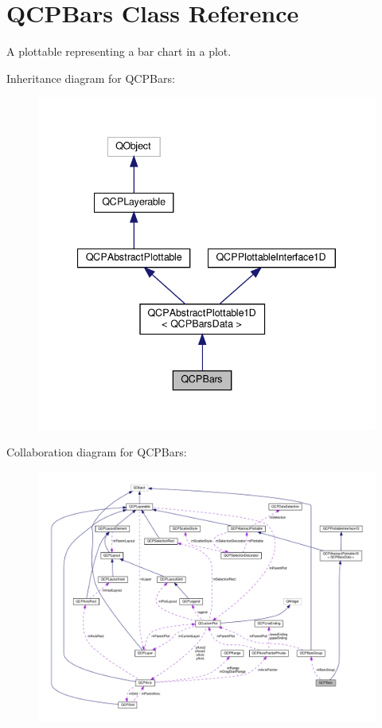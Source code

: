 \hypertarget{classQCPBars}{}\section{Q\+C\+P\+Bars Class Reference}
\label{classQCPBars}


A plottable representing a bar chart in a plot.  




Inheritance diagram for Q\+C\+P\+Bars\+:\nopagebreak
\begin{figure}[H]
\begin{center}
\leavevmode
\includegraphics[width=340pt]{classQCPBars__inherit__graph}
\end{center}
\end{figure}


Collaboration diagram for Q\+C\+P\+Bars\+:\nopagebreak
\begin{figure}[H]
\begin{center}
\leavevmode
\includegraphics[width=350pt]{classQCPBars__coll__graph}
\end{center}
\end{figure}

